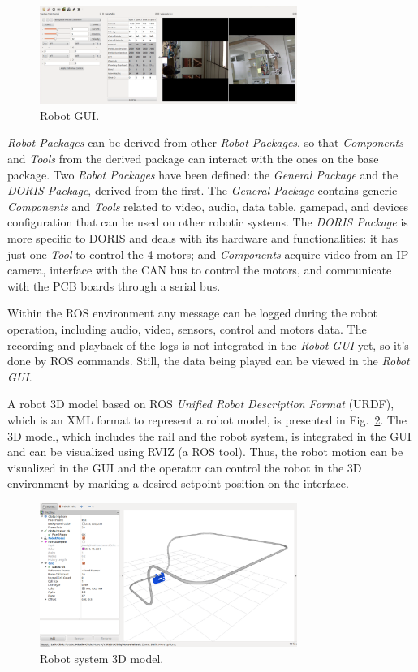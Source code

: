 \documentclass{ifacconf}
\begin{document}
\begin{figure}[!h]
\centering
\includegraphics[width=8.4cm]{figs/robotgui2.png}
\caption{Robot GUI.}
\label{fig:robotgui}
\end{figure}

\emph{Robot Packages} can be derived from other \emph{Robot Packages}, so that
\emph{Components} and \emph{Tools} from the derived package can interact with
the ones on the base package. Two \emph{Robot Packages} have been defined: the
\emph{General Package} and the \emph{DORIS Package}, derived from the first.
The \emph{General Package} contains generic \emph{Components} and \emph{Tools}
related to video, audio, data table, gamepad, and devices configuration that can
be used on other robotic systems. The \emph{DORIS Package} is more specific to
DORIS and deals with its hardware and functionalities: it has just one
\emph{Tool} to control the 4 motors; and \emph{Components} acquire video from
an IP camera, interface with the CAN bus to control the motors, and communicate
with the PCB boards through a serial bus.

Within the ROS environment any message can be logged during the robot
operation, including audio, video, sensors, control and motors data. The
recording and playback of the logs is not integrated in the \emph{Robot GUI}
yet, so it's done by ROS commands. Still, the data being played can be viewed
in the \emph{Robot GUI}.

A robot 3D model based on ROS \emph{Unified Robot Description Format} (URDF),
which is an XML format to represent a robot model, is presented in Fig.~\ref{fig:rviz}.
The 3D model, which includes the rail and the robot system, is integrated in the GUI and can be
visualized using RVIZ (a ROS tool). Thus, the robot motion can be visualized
in the GUI and the operator can control the robot in the 3D environment by
marking a desired setpoint position on the interface.

\begin{figure}[!h]
\centering
\includegraphics[width=8.4cm]{figs/rviz.png}
\caption{Robot system 3D model.}
\label{fig:rviz}
\end{figure}
\end{document}
